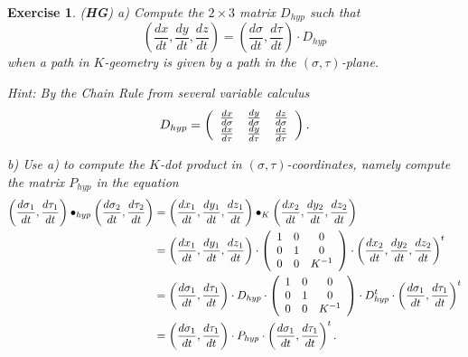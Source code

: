 \documentclass{article}%
\newtheorem{exercise}[theorem]{Exercise}
\begin{document}
\begin{exercise}
(\textbf{HG}) a) Compute the $2\times3$ matrix $D_{hyp}$ such that%
\[
\left(  \frac{dx}{dt},\frac{dy}{dt},\frac{dz}{dt}\right)  =\left(
\frac{d\sigma}{dt},\frac{d\tau}{dt}\right)  \cdot D_{hyp}%
\]
when a path in $K$-geometry is given by a path in the $\left(  \sigma
,\tau\right)  $-plane.

Hint: By the Chain Rule from several variable calculus%
\[
D_{hyp}=\left(
\begin{array}
[c]{ccc}%
\frac{dx}{d\sigma} & \frac{dy}{d\sigma} & \frac{dz}{d\sigma}\\
\frac{dx}{d\tau} & \frac{dy}{d\tau} & \frac{dz}{d\tau}%
\end{array}
\right)  .
\]


b) Use a) to compute the $K$-dot product in $\left(  \sigma,\tau\right)
$-coordinates, namely compute the matrix $P_{hyp}$ in the equation%
\begin{align*}
\left(  \frac{d\sigma_{1}}{dt},\frac{d\tau_{1}}{dt}\right)  \bullet
_{hyp}\left(  \frac{d\sigma_{2}}{dt},\frac{d\tau_{2}}{dt}\right)   &  =\left(
\frac{dx_{1}}{dt},\frac{dy_{1}}{dt},\frac{dz_{1}}{dt}\right)  \bullet
_{K}\left(  \frac{dx_{2}}{dt},\frac{dy_{2}}{dt},\frac{dz_{2}}{dt}\right) \\
&  =\left(  \frac{dx_{1}}{dt},\frac{dy_{1}}{dt},\frac{dz_{1}}{dt}\right)
\cdot\left(
\begin{array}
[c]{ccc}%
1 & 0 & 0\\
0 & 1 & 0\\
0 & 0 & K^{-1}%
\end{array}
\right)  \cdot\left(  \frac{dx_{2}}{dt},\frac{dy_{2}}{dt},\frac{dz_{2}}%
{dt}\right)  ^{t}\\
&  =\left(  \frac{d\sigma_{1}}{dt},\frac{d\tau_{1}}{dt}\right)  \cdot
D_{hyp}\cdot\left(
\begin{array}
[c]{ccc}%
1 & 0 & 0\\
0 & 1 & 0\\
0 & 0 & K^{-1}%
\end{array}
\right)  \cdot D_{hyp}^{t}\cdot\left(  \frac{d\sigma_{1}}{dt},\frac{d\tau_{1}%
}{dt}\right)  ^{t}\\
&  =\left(  \frac{d\sigma_{1}}{dt},\frac{d\tau_{1}}{dt}\right)  \cdot
P_{hyp}\cdot\left(  \frac{d\sigma_{1}}{dt},\frac{d\tau_{1}}{dt}\right)  ^{t}.
\end{align*}

\end{exercise}
\end{document}
